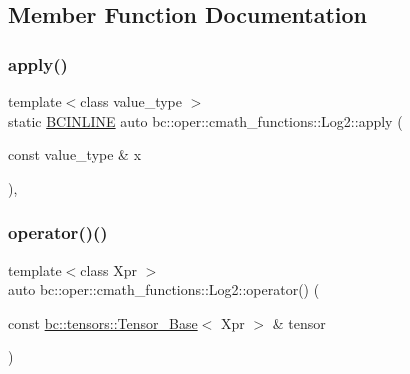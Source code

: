 \subsection{Member Function Documentation}
\mbox{\label{structbc_1_1oper_1_1cmath__functions_1_1Log2_a4bbe653b401add993394e3cb60c9de58}} 
\subsubsection{\texorpdfstring{apply()}{apply()}}
{\footnotesize\ttfamily template$<$class value\+\_\+type $>$ \\
static \hyperlink{common_8h_a6699e8b0449da5c0fafb878e59c1d4b1}{B\+C\+I\+N\+L\+I\+NE} auto bc\+::oper\+::cmath\+\_\+functions\+::\+Log2\+::apply (\begin{DoxyParamCaption}\item[{const value\+\_\+type \&}]{x }\end{DoxyParamCaption})\hspace{0.3cm}{\ttfamily [inline]}, {\ttfamily [static]}}

\mbox{\label{structbc_1_1oper_1_1cmath__functions_1_1Log2_a8ef24238234bef42522aa9522346c2b9}} 
\subsubsection{\texorpdfstring{operator()()}{operator()()}\hspace{0.1cm}{\footnotesize\ttfamily [1/3]}}
{\footnotesize\ttfamily template$<$class Xpr $>$ \\
auto bc\+::oper\+::cmath\+\_\+functions\+::\+Log2\+::operator() (\begin{DoxyParamCaption}\item[{const \hyperlink{classbc_1_1tensors_1_1Tensor__Base}{bc\+::tensors\+::\+Tensor\+\_\+\+Base}$<$ Xpr $>$ \&}]{tensor }\end{DoxyParamCaption})\hspace{0.3cm}{\ttfamily [inline]}}

